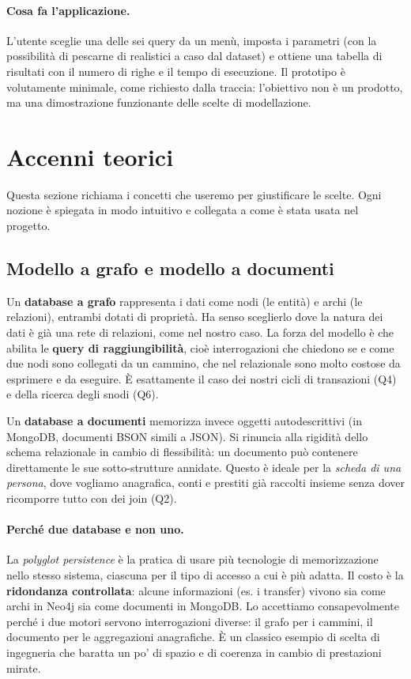 \documentclass[11pt,a4paper]{article}
\begin{document}
\paragraph{Cosa fa l'applicazione.} L'utente sceglie una delle sei query da
un men\`u, imposta i parametri (con la possibilit\`a di pescarne di realistici a
caso dal dataset) e ottiene una tabella di risultati con il numero di righe e il
tempo di esecuzione. Il prototipo \`e volutamente minimale, come richiesto dalla
traccia: l'obiettivo non \`e un prodotto, ma una dimostrazione funzionante delle
scelte di modellazione.

\section{Accenni teorici}

Questa sezione richiama i concetti che useremo per giustificare le scelte. Ogni
nozione \`e spiegata in modo intuitivo e collegata a come \`e stata usata nel
progetto.

\subsection{Modello a grafo e modello a documenti}

Un \textbf{database a grafo} rappresenta i dati come nodi (le entit\`a) e archi
(le relazioni), entrambi dotati di propriet\`a. Ha senso sceglierlo dove la
natura dei dati \`e gi\`a una rete di relazioni, come nel nostro caso. La forza
del modello \`e che abilita le \textbf{query di raggiungibilit\`a}, cio\`e
interrogazioni che chiedono se e come due nodi sono collegati da un cammino,
che nel relazionale sono molto costose da esprimere e da eseguire. \`E
esattamente il caso dei nostri cicli di transazioni (Q4) e della ricerca degli
snodi (Q6).

Un \textbf{database a documenti} memorizza invece oggetti autodescrittivi (in
MongoDB, documenti BSON simili a JSON). Si rinuncia alla rigidit\`a dello schema
relazionale in cambio di flessibilit\`a: un documento pu\`o contenere
direttamente le sue sotto-strutture annidate. Questo \`e ideale per la
\emph{scheda di una persona}, dove vogliamo anagrafica, conti e prestiti gi\`a
raccolti insieme senza dover ricomporre tutto con dei join (Q2).

\paragraph{Perch\'e due database e non uno.} La \emph{polyglot persistence}
\`e la pratica di usare pi\`u tecnologie di memorizzazione nello stesso sistema,
ciascuna per il tipo di accesso a cui \`e pi\`u adatta. Il costo \`e la
\textbf{ridondanza controllata}: alcune informazioni (es. i transfer) vivono sia
come archi in Neo4j sia come documenti in MongoDB. Lo accettiamo
consapevolmente perch\'e i due motori servono interrogazioni diverse: il grafo
per i cammini, il documento per le aggregazioni anagrafiche. \`E un classico
esempio di scelta di ingegneria che baratta un po' di spazio e di coerenza in
cambio di prestazioni mirate.
\end{document}
